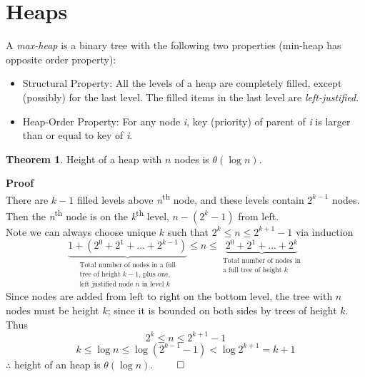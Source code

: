 \documentclass[12pt]{article}
\theoremstyle{definition}
\newtheorem*{theorem}{Theorem}
\begin{document}
\section{Heaps}
A \emph{max-heap} is a binary tree with the following two properties (min-heap has opposite order property):
\begin{itemize}
  \item Structural Property: All the levels of a heap are completely filled, except (possibly) for the last level.
  The filled items in the last level are \emph{left-justified}.
  \item Heap-Order Property: For any node \emph{i}, key (priority) of parent of \emph{i} is larger than or equal to key of \emph{i}.
\end{itemize}

\begin{theorem}
  Height of a heap with $n$ nodes is $\theta(\log n)$.
\end{theorem}
\textbf{Proof} \\
There are $k - 1$ filled levels above \emph{n}\textsuperscript{th} node, and these levels contain $2^{k-1}$ nodes. \\
Then the \emph{n}\textsuperscript{th} node is on the \emph{k}\textsuperscript{th} level, $n - (2^{k} - 1)$ from left. \\
Note we can always choose unique $k$ such that $2^{k} \leq n \leq 2^{k+1} - 1$ via induction
\[
\underbrace{1 + (2^{0} + 2^{1} + \dots + 2^{k-1})}_{\substack{\text{Total number of nodes in a full}\\\text{tree of height }k-1\text{, plus one,}\\\text{left justified node }n\text{ in level }k}} \leq
n \leq
\underbrace{2^{0} + 2^{1} + \dots + 2^{k}}_{\substack{\text{Total number of nodes in}\\\text{a full tree of height }k}}
\]
Since nodes are added from left to right on the bottom level, the tree with $n$ nodes must be height $k$; since it is bounded on both sides by trees of height $k$.
Thus
$$2^{k} \leq n \leq 2^{k+1} - 1$$
$$k \leq \log n \leq \log(2^{k-1}-1) < \log 2^{k+1} = k + 1$$
$\therefore$ height of an heap is $\theta(\log n)$. $\hfill \qed$
\end{document}
